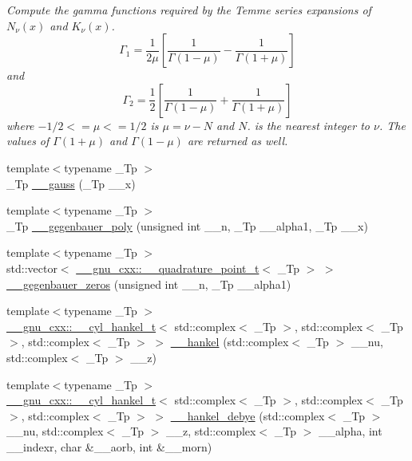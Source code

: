 \begin{DoxyCompactItemize}
\begin{DoxyCompactList}\small\item\em Compute the gamma functions required by the Temme series expansions of $ N_\nu(x) $ and $ K_\nu(x) $. \[ \Gamma_1 = \frac{1}{2\mu} \left[\frac{1}{\Gamma(1 - \mu)} - \frac{1}{\Gamma(1 + \mu)}\right] \] and \[ \Gamma_2 = \frac{1}{2} \left[\frac{1}{\Gamma(1 - \mu)} + \frac{1}{\Gamma(1 + \mu)}\right] \] where $ -1/2 <= \mu <= 1/2 $ is $ \mu = \nu - N $ and $ N $. is the nearest integer to $ \nu $. The values of $ \Gamma(1 + \mu) $ and $ \Gamma(1 - \mu) $ are returned as well. \end{DoxyCompactList}\item 
{\footnotesize template$<$typename \+\_\+\+Tp $>$ }\\\+\_\+\+Tp \hyperlink{namespacestd_1_1____detail_afdb25beb2328b74d64d9be03de64c442}{\+\_\+\+\_\+gauss} (\+\_\+\+Tp \+\_\+\+\_\+x)
\item 
{\footnotesize template$<$typename \+\_\+\+Tp $>$ }\\\+\_\+\+Tp \hyperlink{namespacestd_1_1____detail_af8641aafc4c639c68963e53d1f6c7083}{\+\_\+\+\_\+gegenbauer\+\_\+poly} (unsigned int \+\_\+\+\_\+n, \+\_\+\+Tp \+\_\+\+\_\+alpha1, \+\_\+\+Tp \+\_\+\+\_\+x)
\item 
{\footnotesize template$<$typename \+\_\+\+Tp $>$ }\\std\+::vector$<$ \hyperlink{struct____gnu__cxx_1_1____quadrature__point__t}{\+\_\+\+\_\+gnu\+\_\+cxx\+::\+\_\+\+\_\+quadrature\+\_\+point\+\_\+t}$<$ \+\_\+\+Tp $>$ $>$ \hyperlink{namespacestd_1_1____detail_adb195fa4e0feab7b1380260e7f56f061}{\+\_\+\+\_\+gegenbauer\+\_\+zeros} (unsigned int \+\_\+\+\_\+n, \+\_\+\+Tp \+\_\+\+\_\+alpha1)
\item 
{\footnotesize template$<$typename \+\_\+\+Tp $>$ }\\\hyperlink{struct____gnu__cxx_1_1____cyl__hankel__t}{\+\_\+\+\_\+gnu\+\_\+cxx\+::\+\_\+\+\_\+cyl\+\_\+hankel\+\_\+t}$<$ std\+::complex$<$ \+\_\+\+Tp $>$, std\+::complex$<$ \+\_\+\+Tp $>$, std\+::complex$<$ \+\_\+\+Tp $>$ $>$ \hyperlink{namespacestd_1_1____detail_a0346301fb5eb7faa659064335675f8c6}{\+\_\+\+\_\+hankel} (std\+::complex$<$ \+\_\+\+Tp $>$ \+\_\+\+\_\+nu, std\+::complex$<$ \+\_\+\+Tp $>$ \+\_\+\+\_\+z)
\item 
{\footnotesize template$<$typename \+\_\+\+Tp $>$ }\\\hyperlink{struct____gnu__cxx_1_1____cyl__hankel__t}{\+\_\+\+\_\+gnu\+\_\+cxx\+::\+\_\+\+\_\+cyl\+\_\+hankel\+\_\+t}$<$ std\+::complex$<$ \+\_\+\+Tp $>$, std\+::complex$<$ \+\_\+\+Tp $>$, std\+::complex$<$ \+\_\+\+Tp $>$ $>$ \hyperlink{namespacestd_1_1____detail_a4051efdcdf6d1ab4a4b26c1c9f6752b6}{\+\_\+\+\_\+hankel\+\_\+debye} (std\+::complex$<$ \+\_\+\+Tp $>$ \+\_\+\+\_\+nu, std\+::complex$<$ \+\_\+\+Tp $>$ \+\_\+\+\_\+z, std\+::complex$<$ \+\_\+\+Tp $>$ \+\_\+\+\_\+alpha, int \+\_\+\+\_\+indexr, char \&\+\_\+\+\_\+aorb, int \&\+\_\+\+\_\+morn)

\end{DoxyCompactItemize}
